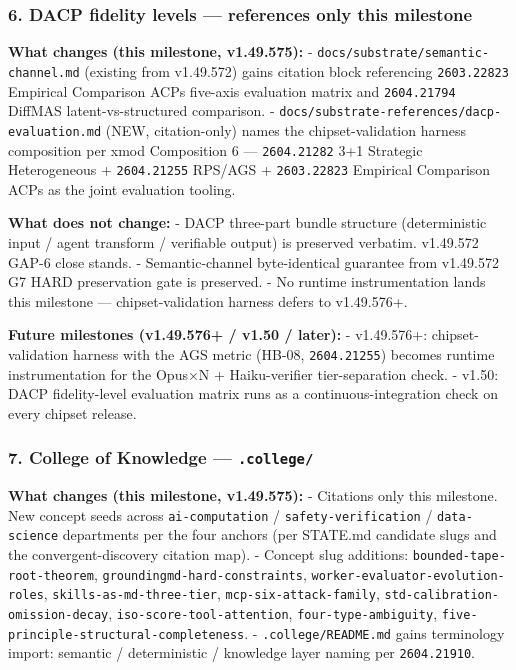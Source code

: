 \documentclass[11pt,letterpaper]{article}
\newcommand{\arxivid}[1]{\texttt{\textcolor{accent}{#1}}}
\begin{document}
\subsubsection{6. DACP fidelity levels --- references only this
milestone}

\textbf{What changes (this milestone, v1.49.575):} -
\texttt{docs/substrate/semantic-channel.md} (existing from v1.49.572)
gains citation block referencing \arxivid{2603.22823} Empirical
Comparison ACPs five-axis evaluation matrix and \arxivid{2604.21794}
DiffMAS latent-vs-structured comparison. -
\texttt{docs/substrate-references/dacp-evaluation.md} (NEW,
citation-only) names the chipset-validation harness composition per xmod
Composition 6 --- \arxivid{2604.21282} 3+1 Strategic Heterogeneous +
\arxivid{2604.21255} RPS/AGS + \arxivid{2603.22823} Empirical Comparison
ACPs as the joint evaluation tooling.

\textbf{What does not change:} - DACP three-part bundle structure
(deterministic input / agent transform / verifiable output) is preserved
verbatim. v1.49.572 GAP-6 close stands. - Semantic-channel
byte-identical guarantee from v1.49.572 G7 HARD preservation gate is
preserved. - No runtime instrumentation lands this milestone ---
chipset-validation harness defers to v1.49.576+.

\textbf{Future milestones (v1.49.576+ / v1.50 / later):} - v1.49.576+:
chipset-validation harness with the AGS metric (HB-08,
\arxivid{2604.21255}) becomes runtime instrumentation for the Opus×N +
Haiku-verifier tier-separation check. - v1.50: DACP fidelity-level
evaluation matrix runs as a continuous-integration check on every
chipset release.

\subsubsection{\texorpdfstring{7. College of Knowledge ---
\texttt{.college/}}{7. College of Knowledge --- .college/}}

\textbf{What changes (this milestone, v1.49.575):} - Citations only this
milestone. New concept seeds across \texttt{ai-computation} /
\texttt{safety-verification} / \texttt{data-science} departments per the
four anchors (per STATE.md candidate slugs and the convergent-discovery
citation map). - Concept slug additions:
\texttt{bounded-tape-root-theorem},
\texttt{groundingmd-hard-constraints},
\texttt{worker-evaluator-evolution-roles},
\texttt{skills-as-md-three-tier}, \texttt{mcp-six-attack-family},
\texttt{std-calibration-omission-decay},
\texttt{iso-score-tool-attention}, \texttt{four-type-ambiguity},
\texttt{five-principle-structural-completeness}. -
\texttt{.college/README.md} gains terminology import: semantic /
deterministic / knowledge layer naming per \arxivid{2604.21910}.
\end{document}
